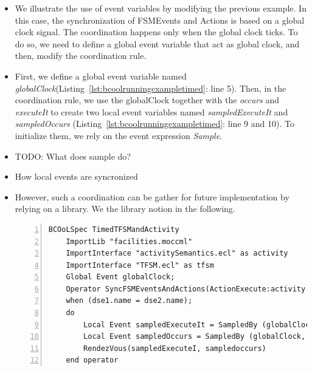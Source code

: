 \begin{itemize}
	
	\item We illustrate the use of event variables by modifying the previous example. In this case, the synchronization of FSMEvents and Actions is based on a global clock signal. The coordination happens only when the global clock ticks. To do so, we need to define a global event variable that act as global clock, and then, modify the coordination rule. 
	
	\item First, we define a global event variable named \emph{globalClock}(Listing~\ref{lst:bcoolrunningexampletimed}: line 5). Then, in the coordination rule, we use the globalClock together with the \dse \emph{occurs} and \emph{executeIt} to create two local event variables named \emph{sampledExecuteIt} and \emph{sampledOccurs} (Listing~\ref{lst:bcoolrunningexampletimed}: line 9 and 10). To initialize them, we rely on the event expression \emph{Sample}. 
	
	\item TODO: What does sample do? 
	
	\item How local events are syncronized 
	
	\item However, such a coordination can be gather for future implementation by relying on a library. We the library notion in the following.
	

	\begin{lstlisting}[language=bcool,
	caption={Synchronized product operator between the TFSM and Activity languages by using Event Variables},
	label={lst:bcoolrunningexampletimed}, 
	basicstyle=\scriptsize\ttfamily, backgroundcolor=\color{LGrey}, numbers=left, xleftmargin=2pt]
	BCOoLSpec TimedTFSMandActivity
	ImportLib "facilities.moccml"
	ImportInterface "activitySemantics.ecl" as activity
	ImportInterface "TFSM.ecl" as tfsm
	Global Event globalClock;
	Operator SyncFSMEventsAndActions(ActionExecute:activity::executeIt, FSMEventOccurs:tfsm::occurs)
	when (dse1.name = dse2.name);
	do
		Local Event sampledExecuteIt = SampledBy (globalClock, ActionExecute);
		Local Event sampledOccurs = SampledBy (globalClock, FSMEventOccurs);
		RendezVous(sampledExecuteI, sampledoccurs)
	end operator
	\end{lstlisting}
	

\end{itemize}
